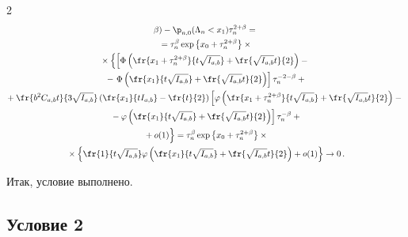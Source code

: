 \begin{multicols}{2}
\begin{multline*}
{{\beta}) - {\p}_{n,0}(\Lambda_n < x_1)}{\tau_n^{2 + \beta}} ={}\\


{}


= \tau_n^{\beta}  \exp\left\{x_0 + \tau_n^{2 + \beta}\right\} \times{}\\


{}


\times \left\{\left[{\Phi}\left(\fr{x_1 + \tau_n^{2 + \beta}}{t\sqrt{I_{a,b}}} +


 \fr{\sqrt{I_{a,b}}t}{2}\right) -{}\right.\right.\\


 {}-\left. {\Phi}\left(\fr{x_1}{t\sqrt{I_{a,b}}} + 


 \fr{\sqrt{I_{a,b}}t}{2}\right)\right]\tau_n^{-2 - \beta} + {}\\


\!{}


+ \fr{b^2C_{a,b}t}{3\sqrt{I_{a,b}}}\left(\fr{x_1}{tI_{a,b}} - \fr{t}{2}\right)\left[ 


\varphi\left(\fr{x_1 + \tau_n^{2 + \beta}}{t\sqrt{I_{a,b}}} + \fr{\sqrt{I_{a,b}}t}{2}\right) - {}\right.\\


\left.{}-\varphi\left(\fr{x_1}{t\sqrt{I_{a,b}}} + \fr{\sqrt{I_{a,b}}t}{2}\right)\right]\tau_n^{-\beta} +{}\\


\left.{}


+  o(1)


\vphantom{\fr{\sqrt{I_a}}{\sqrt{I_a}}}


\right\} = \tau_n^{\beta}  \exp\left\{x_0 + \tau_n^{2 + \beta}\right\} \times{}\\


{}\times


\left\{\fr{1}{t\sqrt{I_{a,b}}}\varphi\left(\fr{x_1}{t\sqrt{I_{a,b}}} + 


\fr{\sqrt{I_{a,b}}t}{2}\right) +  o(1)\right\} \to 0\,.


\end{multline*}


Итак, условие выполнено.





\subsection{Условие 2}






\end{multicols}
